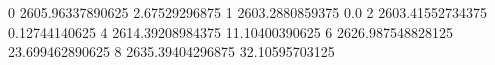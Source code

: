 0 2605.96337890625 2.67529296875
1 2603.2880859375 0.0
2 2603.41552734375 0.12744140625
4 2614.39208984375 11.10400390625
6 2626.987548828125 23.699462890625
8 2635.39404296875 32.10595703125
